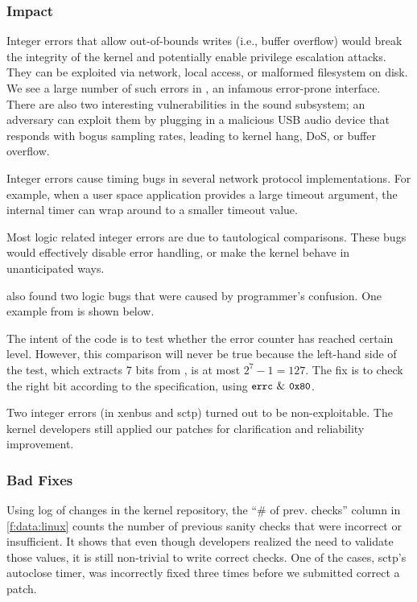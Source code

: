 \subsubsection{Impact}

Integer errors that allow out-of-bounds writes (i.e., buffer
overflow) would break the integrity of the kernel and potentially
enable privilege escalation attacks.  They can be exploited via network,
local access, or malformed filesystem on disk.  We see a large number of
such errors in , an infamous error-prone interface.
%
There are also two interesting vulnerabilities in the sound subsystem;
an adversary can exploit them by plugging in a malicious USB audio
device that responds with bogus sampling rates, leading to kernel
hang, DoS, or buffer overflow.

Integer errors cause timing bugs in several network protocol
implementations.  For example, when a user space application provides
a large timeout argument, the internal timer can wrap around
to a smaller timeout value.

Most logic related integer errors are due to tautological comparisons.
These bugs would effectively disable error handling, or make the kernel
behave in unanticipated ways. 

\sys also found two logic bugs that were caused by programmer's
confusion. One example from  is shown below.

The intent of the code is to test whether the error counter 
has reached certain level.  However, this
comparison will never be true because the left-hand side of the test,
which extracts 7 bits from , is at most
$2^7 - 1 = 127$.  The fix is to check the right bit according to the
specification, using $\cc{errc}\ \&\ \cc{0x80}$.

Two integer errors (in xenbus and sctp) turned out
to be non-exploitable.  The kernel developers still applied our
patches for clarification and reliability improvement.

\subsubsection{Bad Fixes}
\label{s:eval:bad}

Using log of changes in the kernel repository,
the ``\# of prev. checks'' column in \autoref{f:data:linux} counts
the number of previous sanity checks that were incorrect or insufficient.
It shows that even though developers realized the need to validate 
those values, it is still non-trivial to write correct checks.
One of the cases, sctp's autoclose timer, was incorrectly fixed
three times before we submitted correct a patch.

